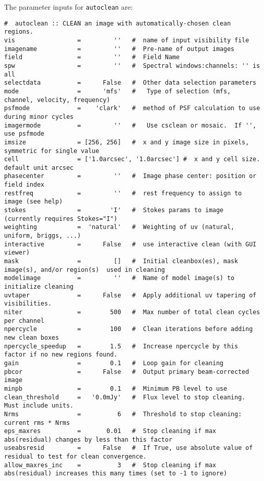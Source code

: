 The parameter inputs for {\tt autoclean} are:
\small
\begin{verbatim}
#  autoclean :: CLEAN an image with automatically-chosen clean regions.
vis                 =         ''   #  name of input visibility file
imagename           =         ''   #  Pre-name of output images
field               =         ''   #  Field Name
spw                 =         ''   #  Spectral windows:channels: '' is all
selectdata          =      False   #  Other data selection parameters
mode                =      'mfs'   #   Type of selection (mfs, channel, velocity, frequency)
psfmode             =    'clark'   #  method of PSF calculation to use during minor cycles
imagermode          =         ''   #   Use csclean or mosaic.  If '', use psfmode
imsize              = [256, 256]   #  x and y image size in pixels, symmetric for single value
cell                = ['1.0arcsec', '1.0arcsec'] #  x and y cell size. default unit arcsec
phasecenter         =         ''   #  Image phase center: position or field index
restfreq            =         ''   #  rest frequency to assign to image (see help)
stokes              =        'I'   #  Stokes params to image (currently requires Stokes="I")
weighting           =  'natural'   #  Weighting of uv (natural, uniform, briggs, ...)
interactive         =      False   #  use interactive clean (with GUI viewer)
mask                =         []   #  Initial cleanbox(es), mask image(s), and/or region(s)  used in cleaning
modelimage          =         ''   #  Name of model image(s) to initialize cleaning
uvtaper             =      False   #  Apply additional uv tapering of visibilities.
niter               =        500   #  Max number of total clean cycles per channel
npercycle           =        100   #  Clean iterations before adding new clean boxes
npercycle_speedup   =        1.5   #  Increase npercycle by this factor if no new regions found.
gain                =        0.1   #  Loop gain for cleaning
pbcor               =      False   #  Output primary beam-corrected image
minpb               =        0.1   #  Minimum PB level to use
clean_threshold     =   '0.0mJy'   #  Flux level to stop cleaning.  Must include units.
Nrms                =          6   #  Threshold to stop cleaning: current rms * Nrms
eps_maxres          =       0.01   #  Stop cleaning if max abs(residual) changes by less than this factor
useabsresid         =      False   #  If True, use absolute value of residual to test for clean convergence.
allow_maxres_inc    =          3   #  Stop cleaning if max abs(residual) increases this many times (set to -1 to ignore)

\end{verbatim}

